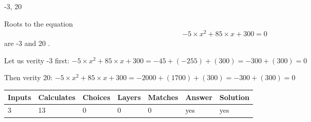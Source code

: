 \documentclass[12pt]{article}
\begin{document}
 

-3,  %
20
 
 
 
\noindent{}
 
 

 
 
 
\noindent{}
 
 

Roots to the equation
\begin{eqnarray*}
-5 \times x^2  %
+  %
85
                 \times x    %
+  %
300 =0
\end{eqnarray*}
are  %
-3 and  %
20 .
 
Let us verity  %
-3 first:
$  %
-5 \times x^2  %
+  %
85
                 \times x    %
+  %
300
  = %
-45+( %
-255)+( %
300)
  = %
-300+( %
300)
  = %
0
$
 
Then verity  %
20:
$  %
-5 \times x^2  %
+  %
85
                 \times x    %
+  %
300
  = %
-2000+( %
1700)+( %
300)
  = %
-300+( %
300)
  = %
0
$
 
 
 
\noindent{}
 
 

 
\vspace{0.3in}
   
   
   
   
\noindent\begin{tabular}{|l|l|l|l|l|l|l|}
 \hline
Inputs & Calculates & Choices & Layers & Matches & Answer & Solution \\ \hline
           3  & 
          13  & 
           0
  & 
           0  & 
           0  & 
  yes & 
  yes 
  \\ \hline
 \end{tabular}
   
   
   
   
\noindent{}
   
   
  
\end{document}
